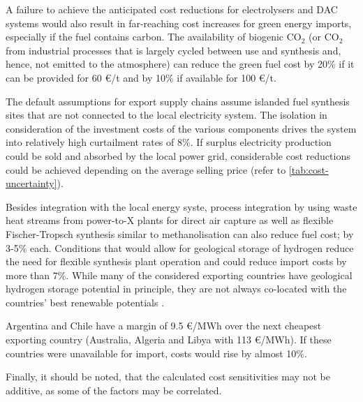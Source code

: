 A failure to achieve the anticipated cost reductions for electrolysers and DAC
systems would also result in far-reaching cost increases for green energy
imports, especially if the fuel contains carbon. The availability of biogenic
CO$_2$ (or CO$_2$ from industrial processes that is largely cycled between use
and synthesis and, hence, not emitted to the atmosphere) can reduce the green
fuel cost by 20\% if it can be provided for 60 \euro{}/t and by 10\% if
available for 100 \euro{}/t.

The default assumptions for export supply chains assume islanded fuel synthesis
sites that are not connected to the local electricity system. The isolation in
consideration of the investment costs of the various components drives the
system into relatively high curtailment rates of 8\%. If surplus electricity
production could be sold and absorbed by the local power grid, considerable cost
reductions could be achieved depending on the average selling price (refer to
\cref{tab:cost-uncertainty}). 

Besides integration with the local energy syste, process integration by using
waste heat streams from power-to-X plants for direct air capture as well as
flexible Fischer-Tropsch synthesis similar to methanolisation can also reduce fuel
cost; by 3-5\% each. Conditions that would allow for geological storage
of hydrogen reduce the need for flexible synthesis plant operation and could
reduce import costs by more than 7\%. While many of the considered exporting
countries have geological hydrogen storage potential in principle, they are not
always co-located with the countries' best renewable potentials
\cite{hevinUndergroundStorage2019}.

Argentina and Chile have a margin of 9.5 \euro{}/MWh over the next cheapest
exporting country (Australia, Algeria and Libya with 113 \euro{}/MWh). If these
countries were unavailable for import, costs would rise by almost 10\%.

Finally, it should be noted, that the calculated cost sensitivities may not be
additive, as some of the factors may be correlated.

